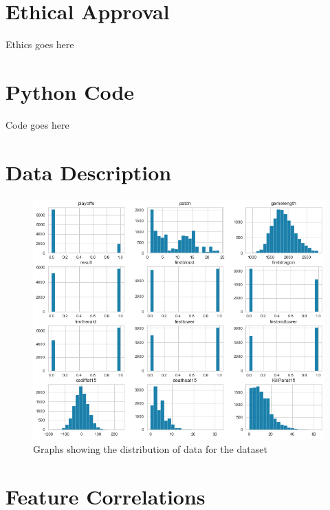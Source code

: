 
\chapter{Ethical Approval}\label{ch:Ethical Approval}

Ethics goes here

\chapter{Python Code}\label{ch:Python Code}

Code goes here

\chapter{Data Description}\label{ch:Data Description}

\begin{figure}[h!]
    \centering
    \includegraphics[width=1\textwidth]{figures/DistributionVisualisation}
    \caption{Graphs showing the distribution of data for the dataset}
    \label{fig:DistroVisual}
\end{figure}

\chapter{Feature Correlations}\label{ch:Feature Correlations}

